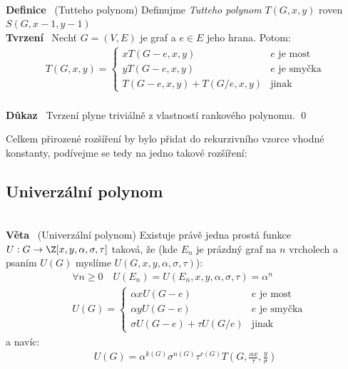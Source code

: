 \documentclass{article}
\renewcommand{\paragraph}[1]{\ \\\smallskip\noindent\textbf{#1}\ }
\begin{document}
\paragraph{Definice} (Tutteho polynom) Definujme \textit{Tutteho polynom}
$T(G, x,y)$ roven $S(G, x-1, y-1)$
\paragraph{Tvrzení} Nechť $G=(V,E)$ je graf a $e\in E$ jeho hrana. Potom:
\begin{align}
	T(G, x, y) = \left\{ \begin{array}{ll}
	x T(G - e, x, y) & e \text{ je most} \\
	y T(G - e, x, y) & e \text{ je smyčka}\\
	T(G-e, x, y) + T(G/e, x, y) & \text{jinak}
	\end{array}
	\right.
\end{align}
\paragraph{Důkaz} Tvrzení plyne triviálně z vlastností rankového polynomu. \qed

Celkem přirozené rozšíření by bylo přidat do rekurzivního vzorce vhodné 
konstanty, podívejme se tedy na jedno takové rozšíření:

\subsection{Univerzální polynom}
\paragraph{Věta} (Univerzální polynom)
Existuje právě jedna prostá funkce $U: G \to \Z[x,y,\alpha,\sigma,\tau]$ taková, 
že (kde $E_n$ je prázdný graf na $n$ vrcholech a psaním $U(G)$ myslíme $U(G, x, 
y, \alpha, \sigma, \tau)$):
\begin{align}
	\label{polynomy:univerzalni:prazdny-graf} &\forall n \geq 0 \quad U(E_n) = 
	U(E_n, x, y, \alpha, \sigma, \tau) = \alpha^n \\
	&U(G) = \left\{ \begin{array}{ll}
	\alpha x U(G - e) & e \text{ je most} \\
	\alpha y U(G - e) & e \text{ je smyčka}\\
	\sigma U(G-e) + \tau U(G/e) & \text{jinak}
	\end{array} \right.
\end{align}
a navíc:
\begin{align}
	\label{polynomy:univerzalni:tutte} U(G) = 
	\alpha^{k(G)}\sigma^{n(G)}\tau^{r(G)} T\left(G, \frac{\alpha x}{\tau}, 
	\frac{y}{\sigma}\right)
\end{align}
\end{document}
